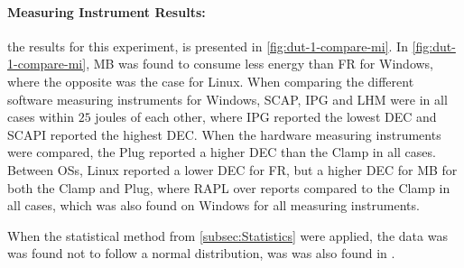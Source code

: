 \paragraph{Measuring Instrument Results:} %
the results for this experiment, is presented in \cref{fig:dut-1-compare-mi}. In \cref{fig:dut-1-compare-mi}, MB was found to consume less energy than FR for Windows, where the opposite was the case for Linux. When comparing the different software measuring instruments for Windows, SCAP, IPG and LHM were in all cases within $25$ joules of each other, where IPG reported the lowest DEC and SCAPI reported the highest DEC. When the hardware measuring instruments were compared, the Plug reported a higher DEC than the Clamp in all cases. Between OSs, Linux reported a lower DEC for FR, but a higher DEC for MB for both the Clamp and Plug, where RAPL over reports compared to the Clamp in all cases, which was also found on Windows for all measuring instruments.







When the statistical method from \cref{subsec:Statistics} were applied, the data was was found not to follow a normal distribution, was was also found in \cite{biksbois, Koedijk2022diff}.%


